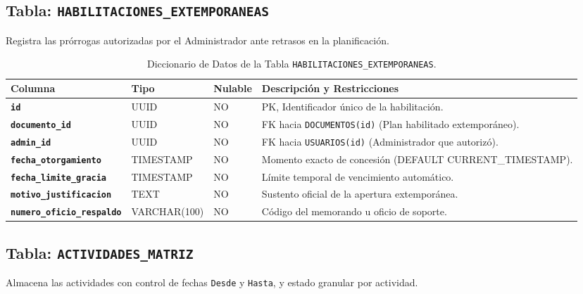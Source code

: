 \documentclass[12pt,a4paper]{article}
\begin{document}
\subsection{Tabla: \texttt{HABILITACIONES\_EXTEMPORANEAS}}
Registra las prórrogas autorizadas por el Administrador ante retrasos en la planificación.

\begin{table}[htbp]
\centering
\small
\begin{tabularx}{\textwidth}{|>{\hsize=0.75\hsize\bfseries}X|>{\hsize=0.55\hsize}X|>{\hsize=0.3\hsize\centering\arraybackslash}X|>{\hsize=1.4\hsize}X|}
    \hline
    \rowcolor{tableheader}
    Columna & Tipo & Nulable & Descripción y Restricciones \\
    \hline
    \texttt{id} & UUID & NO & PK, Identificador único de la habilitación. \\
    \hline
    \texttt{documento\_id} & UUID & NO & FK hacia \texttt{DOCUMENTOS(id)} (Plan habilitado extemporáneo). \\
    \hline
    \texttt{admin\_id} & UUID & NO & FK hacia \texttt{USUARIOS(id)} (Administrador que autorizó). \\
    \hline
    \texttt{fecha\_otorgamiento} & TIMESTAMP & NO & Momento exacto de concesión (DEFAULT CURRENT\_TIMESTAMP). \\
    \hline
    \texttt{fecha\_limite\_gracia} & TIMESTAMP & NO & Límite temporal de vencimiento automático. \\
    \hline
    \texttt{motivo\_justificacion} & TEXT & NO & Sustento oficial de la apertura extemporánea. \\
    \hline
    \texttt{numero\_oficio\_respaldo} & VARCHAR(100) & NO & Código del memorando u oficio de soporte. \\
    \hline
\end{tabularx}
\caption{Diccionario de Datos de la Tabla \texttt{HABILITACIONES\_EXTEMPORANEAS}.}
\label{tab:s2_04_hab}
\end{table}

\subsection{Tabla: \texttt{ACTIVIDADES\_MATRIZ}}
Almacena las actividades con control de fechas \texttt{Desde} y \texttt{Hasta}, y estado granular por actividad.
\end{document}
